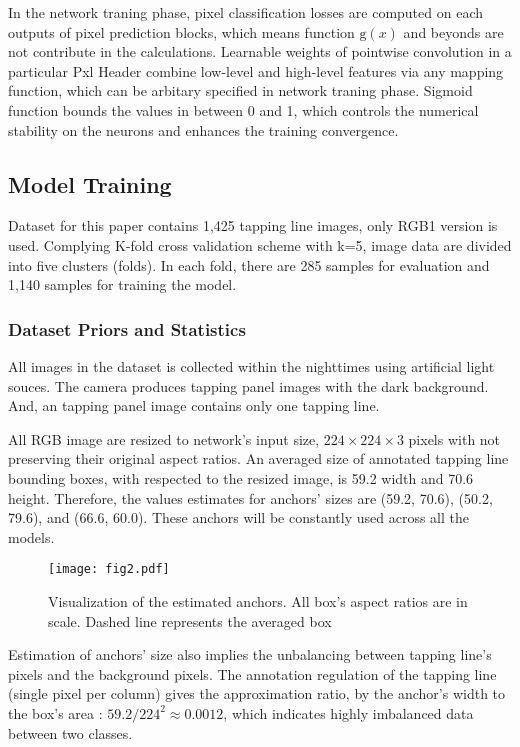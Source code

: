 \documentclass[default,pdflatex,iicol]{sn-jnl}%
\begin{document}
In the network traning phase, pixel classification losses are computed on each outputs of pixel prediction blocks, which means function $\mathrm{g}(x)$ and beyonds are not contribute in the calculations. Learnable weights of pointwise convolution in a particular Pxl Header combine low-level and high-level features via any mapping function, which can be arbitary specified in network traning phase. Sigmoid function bounds the values in between 0 and 1, which controls the numerical stability on the neurons and enhances the training convergence.

\subsection{Model Training}
Dataset for this paper contains 1,425 tapping line images, only RGB1 version \cite{Wongtanawijit_2021} is used. Complying K-fold cross validation scheme with k=5, image data are divided into five clusters (folds). In each fold, there are 285 samples for evaluation and 1,140 samples for training the model.

\subsubsection{Dataset Priors and Statistics}
All images in the dataset is collected within the nighttimes using artificial light souces. The camera produces tapping panel images with the dark background. And, an tapping panel image contains only one tapping line.

All RGB image are resized to network's input size, $224\times224\times3$ pixels with not preserving their original aspect ratios. An averaged size of annotated tapping line bounding boxes, with respected to the resized image, is 59.2 width and 70.6 height. Therefore, the values estimates for anchors' sizes are (59.2, 70.6), (50.2, 79.6), and (66.6, 60.0). These anchors will be constantly used across all the models.

\begin{figure}[h]%
\centering
\texttt{[image: fig2.pdf]}
\caption{Visualization of the estimated anchors. All box's aspect ratios are in scale. Dashed line represents the averaged box}\label{fig2-anchors}
\end{figure}

Estimation of anchors' size also implies the unbalancing between tapping line's pixels and the background pixels. The annotation regulation of the tapping line (single pixel per column) gives the approximation ratio, by the anchor's width to the box's area : $59.2 / 224^2 \approx 0.0012$, which indicates highly imbalanced data between two classes.
\end{document}
